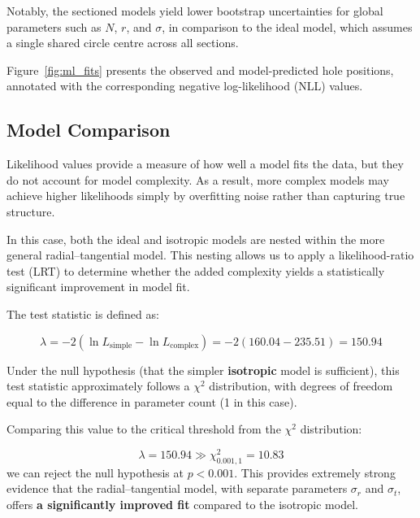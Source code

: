 \documentclass[11pt]{article}
\begin{document}
Notably, the sectioned models yield lower bootstrap uncertainties for global parameters such as $N$, $r$, and $\sigma$, in comparison to the ideal model, which assumes a single shared circle centre across all sections.

Figure~\ref{fig:ml_fits} presents the observed and model-predicted hole positions, annotated with the corresponding negative log-likelihood (NLL) values.


\subsection{Model Comparison}
\label{sec:lrt}

Likelihood values provide a measure of how well a model fits the data, but they do not account for model complexity. As a result, more complex models may achieve higher likelihoods simply by overfitting noise rather than capturing true structure.


In this case, both the ideal and isotropic models are nested within the more general radial–tangential model.  This nesting allows us to apply a likelihood-ratio test (LRT) to determine whether the added complexity yields a statistically significant improvement in model fit.

The test statistic is defined as:

$$
\lambda = -2(\ln L_{\text{simple}} - \ln L_{\text{complex}}) = -2(160.04 - 235.51) = 150.94
$$

Under the null hypothesis (that the simpler \textbf{isotropic} model is sufficient), this test statistic approximately follows a $\chi^2$ distribution, with degrees of freedom equal to the difference in parameter count (1 in this case).

Comparing this value to the critical threshold from the \(\chi^2\) distribution:

\[
\lambda = 150.94 \gg \chi^2_{0.001,1} = 10.83
\]
we can reject the null hypothesis at $p < 0.001$. This provides extremely strong evidence that the radial–tangential model, with separate parameters $\sigma_r$ and $\sigma_t$, offers \textbf{a significantly improved fit} compared to the isotropic model.
\end{document}
